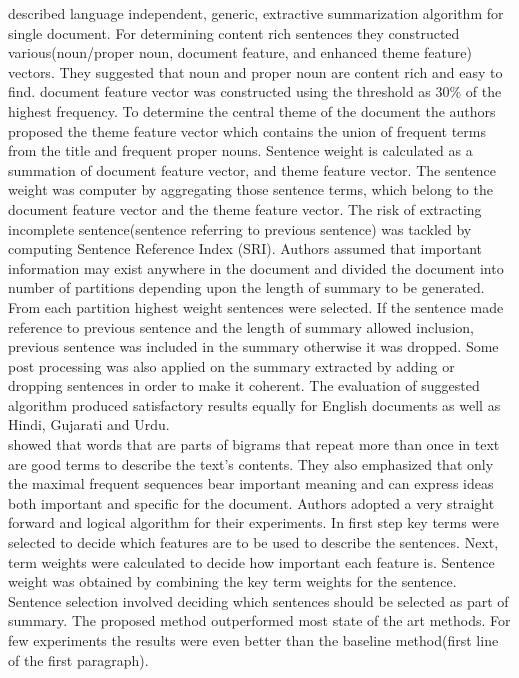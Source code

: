  described language independent, generic, extractive summarization algorithm for single document. For determining content rich sentences 
they constructed various(noun/proper noun, document feature, and enhanced theme feature) vectors. They suggested that noun and proper noun are content rich and easy to find. 
document feature vector was constructed using the threshold as 30\% of the highest frequency. To determine the central theme of the document the authors proposed the theme 
feature vector which contains the union of frequent terms from the title and frequent proper nouns. Sentence weight is calculated as a summation of document feature vector,
and theme feature vector. The sentence weight was computer by aggregating those sentence terms, which belong to the document feature vector and the theme feature vector. 
The risk of extracting incomplete sentence(sentence referring to previous sentence) was tackled by computing Sentence Reference Index (SRI). Authors assumed that
important information may exist anywhere in the document and divided the document into number of partitions depending upon the length of summary to be 
generated. From each partition highest weight sentences were selected. If the sentence made reference to previous sentence and the length of summary allowed
inclusion, previous sentence was included in the summary otherwise it was dropped. Some post processing was also applied on the summary extracted by adding or
dropping sentences in order to make it coherent. The evaluation of suggested algorithm produced satisfactory results equally for English documents as well as 
Hindi, Gujarati and Urdu. \\

 showed that words that are parts of bigrams that repeat more than once in text are good terms to describe the text's contents. 
They also emphasized that only the maximal frequent sequences bear important meaning and can express ideas both important and specific for the document. Authors adopted
a very straight forward and logical algorithm for their experiments. In first step key terms were selected to decide which features are to be used to describe the 
sentences. Next, term weights were calculated to decide how important each feature is. Sentence weight was obtained by combining the key term weights for the sentence. 
Sentence selection involved deciding which sentences should be selected as part of summary. The proposed method outperformed most state of the  art methods. 
For few experiments the results were even better than the baseline method(first line of the first paragraph). 

\clearpage 
